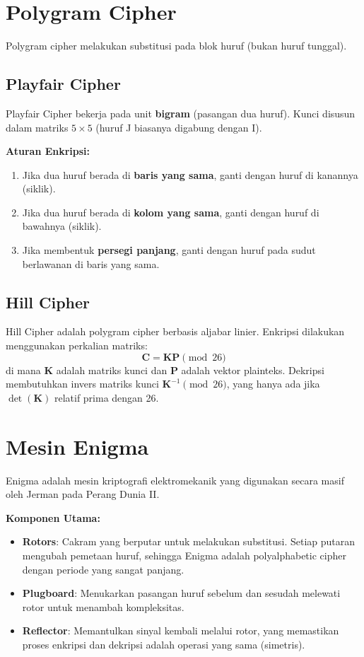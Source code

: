 \documentclass[../main.tex]{subfiles}
\begin{document}
\section{Polygram Cipher}
Polygram cipher melakukan substitusi pada blok huruf (bukan huruf tunggal).

\subsection{Playfair Cipher}
Playfair Cipher bekerja pada unit \textbf{bigram} (pasangan dua huruf). Kunci disusun dalam matriks $5 \times 5$ (huruf J biasanya digabung dengan I).

\textbf{Aturan Enkripsi:}
\begin{enumerate}
    \item Jika dua huruf berada di \textbf{baris yang sama}, ganti dengan huruf di kanannya (siklik).
    \item Jika dua huruf berada di \textbf{kolom yang sama}, ganti dengan huruf di bawahnya (siklik).
    \item Jika membentuk \textbf{persegi panjang}, ganti dengan huruf pada sudut berlawanan di baris yang sama.
\end{enumerate}

\subsection{Hill Cipher}
Hill Cipher adalah polygram cipher berbasis aljabar linier. Enkripsi dilakukan menggunakan perkalian matriks:
\[ \mathbf{C} = \mathbf{KP} \pmod{26} \]
di mana $\mathbf{K}$ adalah matriks kunci dan $\mathbf{P}$ adalah vektor plainteks. Dekripsi membutuhkan invers matriks kunci $\mathbf{K}^{-1} \pmod{26}$, yang hanya ada jika $\det(\mathbf{K})$ relatif prima dengan 26.

\section{Mesin Enigma}
Enigma adalah mesin kriptografi elektromekanik yang digunakan secara masif oleh Jerman pada Perang Dunia II.

\textbf{Komponen Utama:}
\begin{itemize}
    \item \textbf{Rotors}: Cakram yang berputar untuk melakukan substitusi. Setiap putaran mengubah pemetaan huruf, sehingga Enigma adalah polyalphabetic cipher dengan periode yang sangat panjang.
    \item \textbf{Plugboard}: Menukarkan pasangan huruf sebelum dan sesudah melewati rotor untuk menambah kompleksitas.
    \item \textbf{Reflector}: Memantulkan sinyal kembali melalui rotor, yang memastikan proses enkripsi dan dekripsi adalah operasi yang sama (simetris).
\end{itemize}
\end{document}
